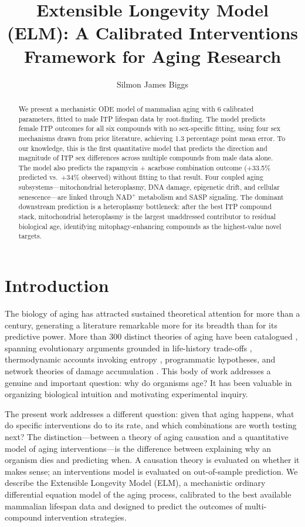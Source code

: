 \documentclass[11pt]{article}
\title{Extensible Longevity Model (ELM): A Calibrated Interventions Framework for Aging Research}
\author{Silmon James Biggs}
\date{}
\begin{document}
\maketitle

\begin{abstract}
We present a mechanistic ODE model of mammalian aging with 6 calibrated parameters, fitted to male ITP lifespan data by root-finding. The model predicts female ITP outcomes for all six compounds with no sex-specific fitting, using four sex mechanisms drawn from prior literature, achieving 1.3 percentage point mean error. To our knowledge, this is the first quantitative model that predicts the direction and magnitude of ITP sex differences across multiple compounds from male data alone. The model also predicts the rapamycin + acarbose combination outcome (+33.5\% predicted vs.\ +34\% observed) without fitting to that result. Four coupled aging subsystems---mitochondrial heteroplasmy, DNA damage, epigenetic drift, and cellular senescence---are linked through NAD$^+$ metabolism and SASP signaling. The dominant downstream prediction is a heteroplasmy bottleneck: after the best ITP compound stack, mitochondrial heteroplasmy is the largest unaddressed contributor to residual biological age, identifying mitophagy-enhancing compounds as the highest-value novel targets.
\end{abstract}

\section{Introduction}

The biology of aging has attracted sustained theoretical attention for more than a century, generating a literature remarkable more for its breadth than for its predictive power. More than 300 distinct theories of aging have been catalogued \citep{Lemoine2021}, spanning evolutionary arguments grounded in life-history trade-offs \citep{Medawar1952,Williams1957,Kirkwood1977}, thermodynamic accounts invoking entropy \citep{Hayflick2007}, programmatic hypotheses, and network theories of damage accumulation \citep{Kowald1997}. This body of work addresses a genuine and important question: why do organisms age? It has been valuable in organizing biological intuition and motivating experimental inquiry.

The present work addresses a different question: given that aging happens, what do specific interventions do to its rate, and which combinations are worth testing next? The distinction---between a theory of aging causation and a quantitative model of aging interventions---is the difference between explaining why an organism dies and predicting when. A causation theory is evaluated on whether it makes sense; an interventions model is evaluated on out-of-sample prediction. We describe the Extensible Longevity Model (ELM), a mechanistic ordinary differential equation model of the aging process, calibrated to the best available mammalian lifespan data and designed to predict the outcomes of multi-compound intervention strategies.
\end{document}

